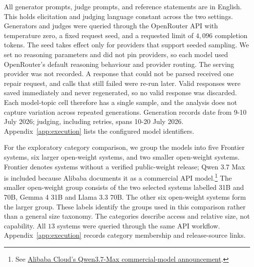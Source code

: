 \documentclass[11pt,a4paper]{article}
\begin{document}
All generator prompts, judge prompts, and reference statements are in English. This holds elicitation and judging language constant across the two settings. Generators and judges were queried through the OpenRouter API with temperature zero, a fixed request seed, and a requested limit of $4{,}096$ completion tokens. The seed takes effect only for providers that support seeded sampling. We set no reasoning parameters and did not pin providers, so each model used OpenRouter's default reasoning behaviour and provider routing. The serving provider was not recorded. A response that could not be parsed received one repair request, and calls that still failed were re-run later. Valid responses were saved immediately and never regenerated, so no valid response was discarded. Each model-topic cell therefore has a single sample, and the analysis does not capture variation across repeated generations. Generation records date from 9-10 July 2026; judging, including retries, spans 10-20 July 2026. Appendix~\ref{app:execution} lists the configured model identifiers.

For the exploratory category comparison, we group the models into five Frontier systems, six larger open-weight systems, and two smaller open-weight systems. Frontier denotes systems without a verified public-weight release; Qwen 3.7 Max is included because Alibaba documents it as a commercial API model.\footnote{See \href{https://www.alibabacloud.com/en/news/product/maxcompute-model-computing-service-supports-qwen37-max-and-other-commercial-models-mkv}{Alibaba Cloud's Qwen3.7-Max commercial-model announcement}.} The smaller open-weight group consists of the two selected systems labelled 31B and 70B, Gemma 4 31B and Llama 3.3 70B. The other six open-weight systems form the larger group. These labels identify the groups used in this comparison rather than a general size taxonomy. The categories describe access and relative size, not capability. All $13$ systems were queried through the same API workflow. Appendix~\ref{app:execution} records category membership and release-source links.
\end{document}
